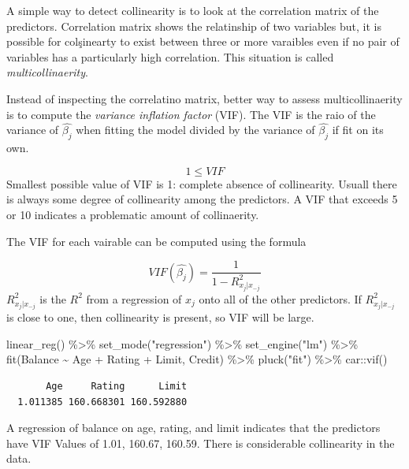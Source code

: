\documentclass[
  letterpaper,
  DIV=11,
  numbers=noendperiod]{scrreprt}
\newenvironment{Shaded}{\begin{snugshade}}{\end{snugshade}}
\newcommand{\FunctionTok}[1]{\textcolor[rgb]{0.02,0.16,0.49}{#1}}
\newcommand{\NormalTok}[1]{\textcolor[rgb]{0.33,0.33,0.33}{#1}}
\newcommand{\SpecialCharTok}[1]{\textcolor[rgb]{0.00,0.46,0.62}{#1}}
\newcommand{\StringTok}[1]{\textcolor[rgb]{0.00,0.50,0.00}{#1}}
\begin{document}
A simple way to detect collinearity is to look at the correlation matrix
of the predictors. Correlation matrix shows the relatinship of two
variables but, it is possible for colşinearty to exist between three or
more varaibles even if no pair of variables has a particularly high
correlation. This situation is called \emph{multicollinaerity}.

Instead of inspecting the correlatino matrix, better way to assess
multicollinaerity is to compute the \emph{variance inflation factor}
(VIF). The VIF is the raio of the variance of \(\hat{\beta_j}\) when
fitting the model divided by the variance of \(\hat{\beta_j}\) if fit on
its own.

\[
1 \leq VIF
\] Smallest possible value of VIF is 1: complete absence of
collinearity. Usuall there is always some degree of collinearity among
the predictors. A VIF that exceeds 5 or 10 indicates a problematic
amount of collinaerity.

The VIF for each vairable can be computed using the formula

\[
VIF(\hat{\beta_j}) = \frac{1}{1-R^2_{x_j | x_{-j}}}
\] \(R^2_{x_j | x_{-j}}\) is the \(R^2\) from a regression of \(x_j\)
onto all of the other predictors. If \(R^2_{x_j | x_{-j}}\) is close to
one, then collinearity is present, so VIF will be large.

\begin{Shaded}
\begin{Highlighting}[]
\FunctionTok{linear\_reg}\NormalTok{() }\SpecialCharTok{\%\textgreater{}\%} 
  \FunctionTok{set\_mode}\NormalTok{(}\StringTok{"regression"}\NormalTok{) }\SpecialCharTok{\%\textgreater{}\%} 
  \FunctionTok{set\_engine}\NormalTok{(}\StringTok{"lm"}\NormalTok{) }\SpecialCharTok{\%\textgreater{}\%} 
  \FunctionTok{fit}\NormalTok{(Balance }\SpecialCharTok{\textasciitilde{}}\NormalTok{ Age }\SpecialCharTok{+}\NormalTok{ Rating }\SpecialCharTok{+}\NormalTok{ Limit, Credit) }\SpecialCharTok{\%\textgreater{}\%} 
  \FunctionTok{pluck}\NormalTok{(}\StringTok{"fit"}\NormalTok{) }\SpecialCharTok{\%\textgreater{}\%} 
\NormalTok{  car}\SpecialCharTok{::}\FunctionTok{vif}\NormalTok{() }
\end{Highlighting}
\end{Shaded}

\begin{verbatim}
       Age     Rating      Limit 
  1.011385 160.668301 160.592880 
\end{verbatim}

A regression of balance on age, rating, and limit indicates that the
predictors have VIF Values of 1.01, 160.67, 160.59. There is
considerable collinearity in the data.
\end{document}
